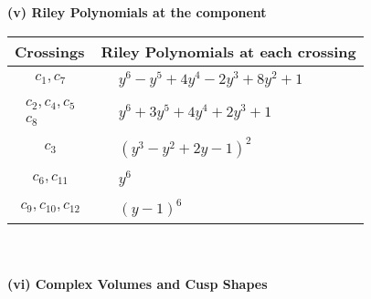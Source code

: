 \documentclass[1p]{elsarticle_modified}
\theoremstyle{definition}
\begin{document}
\newpage\renewcommand{\arraystretch}{1}
\flushleft \textbf{(v) Riley Polynomials at the component}\newline \\
\begin{tabular}{m{50pt}|m{274pt}}
Crossings & \hspace{64pt}Riley Polynomials at each crossing \\
\hline $$\begin{aligned}c_{1},c_{7}\end{aligned}$$&$\begin{aligned}
&y^6- y^5+4 y^4-2 y^3+8 y^2+1
\end{aligned}$\\
\hline $$\begin{aligned}c_{2},c_{4},c_{5}\\c_{8}\end{aligned}$$&$\begin{aligned}
&y^6+3 y^5+4 y^4+2 y^3+1
\end{aligned}$\\
\hline $$\begin{aligned}c_{3}\end{aligned}$$&$\begin{aligned}
&(y^3- y^2+2 y-1)^2
\end{aligned}$\\
\hline $$\begin{aligned}c_{6},c_{11}\end{aligned}$$&$\begin{aligned}
&y^6
\end{aligned}$\\
\hline $$\begin{aligned}c_{9},c_{10},c_{12}\end{aligned}$$&$\begin{aligned}
&(y-1)^6
\end{aligned}$\\
\hline
\end{tabular}\\~\\
\newpage\flushleft \textbf{(vi) Complex Volumes and Cusp Shapes}
\end{document}
